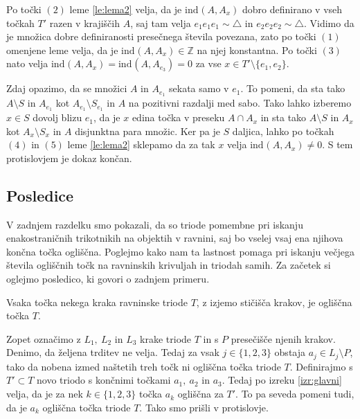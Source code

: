 \documentclass[mat1]{fmfdelo}
\newcommand{\Z}{\mathbb Z}
\newcommand{\ind}[3][]{\text{ind}_{#1}(#2, #3)}
\begin{document}
Po točki $(2)$ leme \ref{le:lema2} velja, da je $\ind{A}{A_x}$ dobro definirano v vseh točkah $T'$ razen v krajiščih $A$, saj tam velja $e_1e_1e_1 \sim \triangle$ in $e_2e_2e_2 \sim \triangle$. Vidimo da je množica dobre definiranosti presečnega števila povezana, zato po točki $(1)$ omenjene leme velja, da je $\ind{A}{A_x} \in \Z$ na njej konstantna. Po točki $(3)$ nato velja $\ind{A}{A_x} = \ind{A}{A_{e_3}} = 0$ za vse $x \in T' \setminus \{e_1, e_2\}$.

Zdaj opazimo, da se množici $A$ in $A_{e_1}$ sekata samo v $e_1$. To pomeni, da sta tako $A\setminus S$ in $A_{e_1}$ kot $A_{e_1}\setminus S_{e_1}$ in $A$ na pozitivni razdalji med sabo. Tako lahko izberemo $x \in S$ dovolj blizu $e_1$, da je $x$ edina točka v preseku $A \cap A_x$ in sta tako $A\setminus S$ in $A_x$ kot $A_x \setminus S_x$ in $A$ disjunktna para množic. Ker pa je $S$ daljica, lahko po točkah $(4)$ in $(5)$ leme \ref{le:lema2} sklepamo da za tak $x$ velja $\ind{A}{A_x} \neq 0$. S tem protislovjem je dokaz končan.
\endproof

\subsection{Posledice}
V zadnjem razdelku smo pokazali, da so triode pomembne pri iskanju enakostraničnih trikotnikih na objektih v ravnini, saj bo vselej vsaj ena njihova končna točka ogliščna. Poglejmo kako nam ta lastnost pomaga pri iskanju večjega števila ogliščnih točk na ravninskih krivuljah in triodah samih. Za začetek si oglejmo posledico, ki govori o zadnjem primeru.
\begin{posledica}\label{posl:trioda}
Vsaka točka nekega kraka ravninske triode $T$, z izjemo stičišča krakov, je ogliščna točka $T$.
\end{posledica}

\proof
Zopet označimo z $L_1,\ L_2$ in $L_3$ krake triode $T$ in s $P$ presečišče njenih krakov. Denimo, da željena trditev ne velja. Tedaj za vsak $j \in \{1, 2, 3\}$ obstaja $a_j \in L_j \setminus P$, tako da nobena izmed naštetih treh točk ni ogliščna točka triode $T$. Definirajmo s $T' \subset T$ novo triodo s končnimi točkami $a_1,\ a_2$ in $a_3$. Tedaj po izreku \ref{izr:glavni} velja, da je za nek $k \in \{1, 2, 3\}$ točka $a_k$ ogliščna za $T'$. To pa seveda pomeni tudi, da je $a_k$ ogliščna točka triode $T$. Tako smo prišli v protislovje.
\endproof
\end{document}
